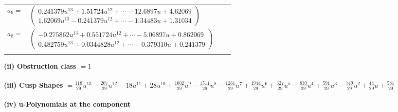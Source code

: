 \documentclass[1p]{elsarticle_modified}
\theoremstyle{definition}
\begin{document}
\begin{tabular}{m{7pt} m{180pt} m{7pt} m{180pt} }
\flushright $a_{9}=$&$\begin{pmatrix}0.241379 u^{13}+1.51724 u^{12}+\cdots-12.6897 u+4.62069\\1.62069 u^{13}-0.241379 u^{12}+\cdots-1.34483 u+1.31034\end{pmatrix}$ \\
\flushright $a_{8}=$&$\begin{pmatrix}-0.275862 u^{13}+0.551724 u^{12}+\cdots-5.06897 u+0.862069\\0.482759 u^{13}+0.0344828 u^{12}+\cdots-0.379310 u+0.241379\end{pmatrix}$\\&\end{tabular}
\flushleft \textbf{(ii) Obstruction class $= 1$}\\~\\
\flushleft \textbf{(iii) Cusp Shapes $= \frac{118}{29} u^{13}-\frac{207}{29} u^{12}-18 u^{11}+28 u^{10}+\frac{1002}{29} u^9-\frac{1511}{29} u^8-\frac{1261}{29} u^7+\frac{1944}{29} u^6+\frac{327}{29} u^5-\frac{830}{29} u^4+\frac{591}{29} u^3-\frac{749}{29} u^2+\frac{44}{29} u+\frac{581}{29}$}\\~\\
\newpage\renewcommand{\arraystretch}{1}
\flushleft \textbf{(iv) u-Polynomials at the component}\newline \\
\end{document}
